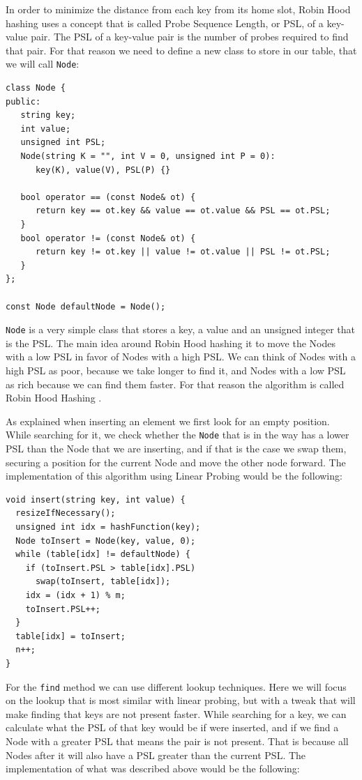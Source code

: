 In order to minimize the distance from each key from its home slot, Robin Hood hashing uses a concept that is called Probe Sequence Length, or PSL, of a key-value pair. The PSL of a key-value pair is the number of probes required to find that pair. For that reason we need to define a new class to store in our table, that we will call \texttt{Node}:

\begin{lstlisting}
class Node {
public:
   string key;
   int value;
   unsigned int PSL;   
   Node(string K = "", int V = 0, unsigned int P = 0):
      key(K), value(V), PSL(P) {}

   bool operator == (const Node& ot) {
      return key == ot.key && value == ot.value && PSL == ot.PSL;
   }
   bool operator != (const Node& ot) {
      return key != ot.key || value != ot.value || PSL != ot.PSL;
   }
};

const Node defaultNode = Node();
\end{lstlisting}

\texttt{Node} is a very simple class that stores a key, a value and an unsigned integer that is the PSL. The main idea around Robin Hood hashing it to move the Nodes with a low PSL in favor of Nodes with a high PSL. We can think of Nodes with a high PSL as poor, because we take longer to find it, and Nodes with a low PSL as rich because we can find them faster. For that reason the algorithm is called Robin Hood Hashing \citep{RobinHoodHashing}.

As explained when inserting an element we first look for an empty position. While searching for it, we check whether the \texttt{Node} that is in the way has a lower PSL than the Node that we are inserting, and if that is the case we swap them, securing a position for the current Node and move the other node forward. The implementation of this algorithm using Linear Probing would be the following:

\begin{lstlisting}
void insert(string key, int value) {
  resizeIfNecessary();
  unsigned int idx = hashFunction(key);
  Node toInsert = Node(key, value, 0);
  while (table[idx] != defaultNode) {
    if (toInsert.PSL > table[idx].PSL)
      swap(toInsert, table[idx]);         
    idx = (idx + 1) % m;
    toInsert.PSL++;
  }
  table[idx] = toInsert;
  n++;
}
\end{lstlisting}

For the \texttt{find} method we can use different lookup techniques. Here we will focus on the lookup that is most similar with linear probing, but with a tweak that will make finding that keys are not present faster. While searching for a key, we can calculate what the PSL of that key would be if were inserted, and if we find a Node with a greater PSL that means the pair is not present. That is because all Nodes after it will also have a PSL greater than the current PSL. The implementation of what was described above would be the following:

